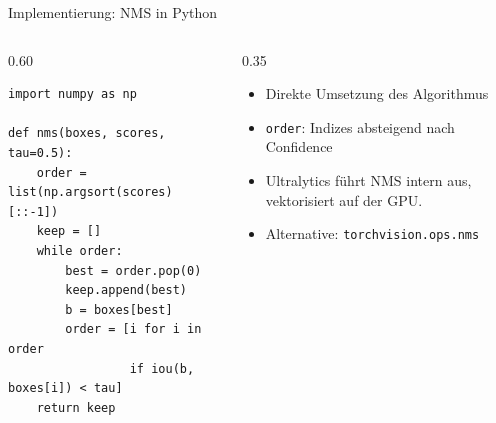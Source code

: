 \begin{frame}[fragile]{Implementierung: NMS in Python}
\begin{columns}
\begin{column}{0.60\textwidth}
{\footnotesize
\begin{verbatim}
import numpy as np

def nms(boxes, scores, tau=0.5):
    order = list(np.argsort(scores)[::-1])
    keep = []
    while order:
        best = order.pop(0)
        keep.append(best)
        b = boxes[best]
        order = [i for i in order
                 if iou(b, boxes[i]) < tau]
    return keep
\end{verbatim}
}
\end{column}
\begin{column}{0.35\textwidth}
\begin{itemize}
  \item Direkte Umsetzung des Algorithmus
  \item \texttt{order}: Indizes absteigend nach Confidence
  \item Ultralytics führt NMS intern aus, vektorisiert auf der GPU.
  \item Alternative: \texttt{torchvision.ops.nms}
\end{itemize}
\end{column}
\end{columns}
\end{frame}

